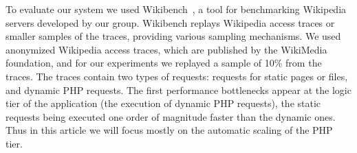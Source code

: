 To evaluate our system we used Wikibench~\cite{wikibench}, a tool for benchmarking Wikipedia 
servers developed by our group. Wikibench replays Wikipedia access
traces or smaller samples of the traces, providing various sampling
mechanisms. We used anonymized Wikipedia access traces, which are 
published by the WikiMedia foundation, and for our experiments we
replayed a sample of 10\% from the traces. The traces contain two 
types of requests: requests for static pages or files, and dynamic
PHP requests. The first performance bottlenecks appear at the logic
tier of the application (the execution of dynamic PHP requests), the static 
requests being executed one order of magnitude faster than the dynamic 
ones. Thus in this article we will focus mostly on the automatic
scaling of the PHP tier.



